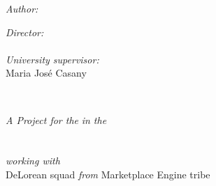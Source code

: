 \documentclass[
11pt, %
oneside, %
english,
singlespacing, %
headsepline, %
]{MastersDoctoralThesis} %
\def \universitysupervisor{Maria José Casany}
\def \tribe{Marketplace Engine tribe}
\def \squad{DeLorean squad}
\newcommand*\NewPage{\newpage\null\thispagestyle{empty}\newpage}
\begin{document}
\begin{titlepage}
\begin{center}
\begin{minipage}[t]{0.4\textwidth}
\begin{flushleft} \large
\emph{Author:}\\
\authorname %
\end{flushleft}
\end{minipage}
\begin{minipage}[t]{0.4\textwidth}
\begin{flushright} \large
\emph{Director:} \\
\supname %
\\
\emph{University supervisor:} \\
\universitysupervisor
\end{flushright}
\end{minipage}\\[3cm]
 
\vfill

\large \textit{A Project for the}
\large \degreename 
\textit{ in the}\\[0.2cm]
\deptname\\[0.2cm]
\facname\\[0.2cm]
\textit{working with}\\[0.2cm]
\squad
\textit{ from}
\tribe\\
\vfill

{\large {}}\\[4cm] %
 
\vfill
\end{center}
\end{titlepage}
\NewPage

\end{document}
